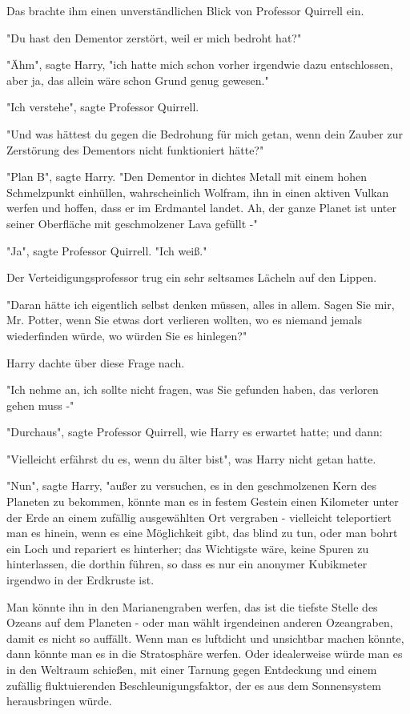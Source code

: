 {Das brachte ihm einen unverständlichen Blick von Professor Quirrell ein.

"Du hast den Dementor zerstört, weil er mich bedroht hat?"

"Ähm", sagte Harry, "ich hatte mich schon vorher irgendwie dazu entschlossen, aber ja, das allein wäre schon Grund genug gewesen."

"Ich verstehe", sagte Professor Quirrell.

"Und was hättest du gegen die Bedrohung für mich getan, wenn dein Zauber zur Zerstörung des Dementors nicht funktioniert hätte?"

"Plan B", sagte Harry. "Den Dementor in dichtes Metall mit einem hohen Schmelzpunkt einhüllen, wahrscheinlich Wolfram, ihn in einen aktiven Vulkan werfen und hoffen, dass er im Erdmantel landet. Ah, der ganze Planet ist unter seiner Oberfläche mit geschmolzener Lava gefüllt -"

"Ja", sagte Professor Quirrell. "Ich weiß."

Der Verteidigungsprofessor trug ein sehr seltsames Lächeln auf den Lippen.

"Daran hätte ich eigentlich selbst denken müssen, alles in allem. Sagen Sie mir, Mr. Potter, wenn Sie etwas dort verlieren wollten, wo es niemand jemals wiederfinden würde, wo würden Sie es hinlegen?"

Harry dachte über diese Frage nach.

"Ich nehme an, ich sollte nicht fragen, was Sie gefunden haben, das verloren gehen muss -"

"Durchaus", sagte Professor Quirrell, wie Harry es erwartet hatte; und dann:

"Vielleicht erfährst du es, wenn du älter bist", was Harry nicht getan hatte.

"Nun", sagte Harry, "außer zu versuchen, es in den geschmolzenen Kern des Planeten zu bekommen, könnte man es in festem Gestein einen Kilometer unter der Erde an einem zufällig ausgewählten Ort vergraben - vielleicht teleportiert man es hinein, wenn es eine Möglichkeit gibt, das blind zu tun, oder man bohrt ein Loch und repariert es hinterher; das Wichtigste wäre, keine Spuren zu hinterlassen, die dorthin führen, so dass es nur ein anonymer Kubikmeter irgendwo in der Erdkruste ist.

Man könnte ihn in den Marianengraben werfen, das ist die tiefste Stelle des Ozeans auf dem Planeten - oder man wählt irgendeinen anderen Ozeangraben, damit es nicht so auffällt. Wenn man es luftdicht und unsichtbar machen könnte, dann könnte man es in die Stratosphäre werfen. Oder idealerweise würde man es in den Weltraum schießen, mit einer Tarnung gegen Entdeckung und einem zufällig fluktuierenden Beschleunigungsfaktor, der es aus dem Sonnensystem herausbringen würde.

}
